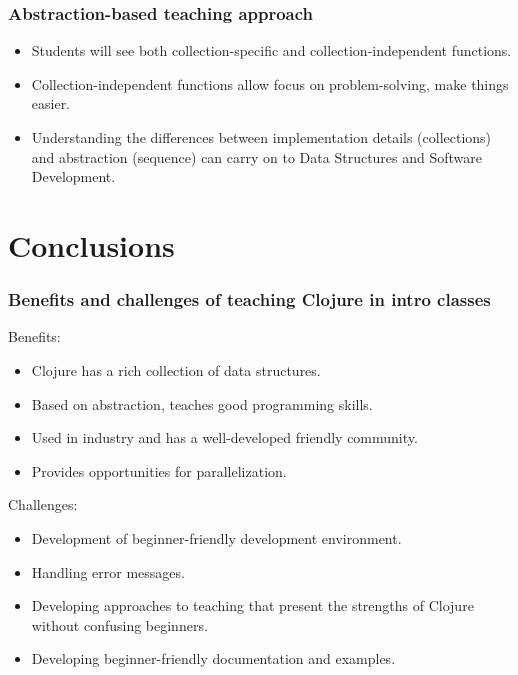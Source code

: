 \documentclass{beamer}
\newcommand{\allcomments}[1]{{#1}}
\newcommand{\joecomment}[1]{{\bf \color{JoesGold}{\allcomments{{#1}}}}}
\begin{document}
\begin{frame}
\frametitle{Abstraction-based teaching approach}
\begin{itemize}
\item Students will see both collection-specific and collection-independent functions. 
\item Collection-independent functions allow focus on problem-solving, make things easier. 
\item Understanding the differences between implementation details (collections) and abstraction (sequence) can carry on to Data Structures and Software Development. %
\end{itemize}
\end{frame}

\section{Conclusions}

\begin{frame}
\frametitle{Benefits and challenges of teaching Clojure in intro classes}
Benefits:
\begin{itemize}
\item Clojure has a rich collection of data structures.
\item Based on abstraction, teaches good programming skills. 
\item Used in industry and has a well-developed friendly community. 
\item Provides opportunities for parallelization. 
\end{itemize}
Challenges:
\begin{itemize}
\item Development of beginner-friendly development environment. 
\item Handling error messages.
\item Developing approaches to teaching that present the strengths of Clojure without confusing beginners. 
\item Developing beginner-friendly documentation and examples. 
\end{itemize}%
\end{frame}
\end{document}
